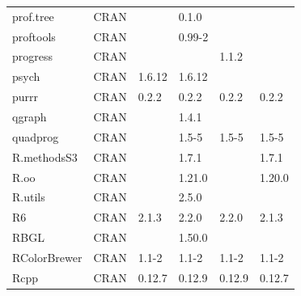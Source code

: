 \begin{longtable}{llllll}
\rowcolor{black!10}
prof.tree                     & CRAN                      &             & 0.1.0       &                &                   \\
\rowcolor{black!5}
proftools                     & CRAN                      &             & 0.99-2      &                &                    \\
\rowcolor{black!10}
progress                      & CRAN                      &             &             & 1.1.2          &                   \\
\rowcolor{black!5}
psych                         & CRAN                      & 1.6.12      & 1.6.12      &                &                    \\
\rowcolor{black!10}
purrr                         & CRAN                      & 0.2.2       & 0.2.2       & 0.2.2          & 0.2.2             \\
\rowcolor{black!5}
qgraph                        & CRAN                      &             & 1.4.1       &                &                    \\
\rowcolor{black!10}
quadprog                      & CRAN                      &             & 1.5-5       & 1.5-5          & 1.5-5             \\
\rowcolor{black!5}
R.methodsS3                   & CRAN                      &             & 1.7.1       &                & 1.7.1              \\
\rowcolor{black!10}
R.oo                          & CRAN                      &             & 1.21.0      &                & 1.20.0            \\
\rowcolor{black!5}
R.utils                       & CRAN                      &             & 2.5.0       &                &                    \\
\rowcolor{black!10}
R6                            & CRAN                      & 2.1.3       & 2.2.0       & 2.2.0          & 2.1.3             \\
\rowcolor{black!5}
RBGL                          & CRAN                      &             & 1.50.0      &                &                    \\
\rowcolor{black!10}
RColorBrewer                  & CRAN                      & 1.1-2       & 1.1-2       & 1.1-2          & 1.1-2             \\
\rowcolor{black!5}
Rcpp                          & CRAN                      & 0.12.7      & 0.12.9      & 0.12.9         & 0.12.7             \\

\end{longtable}

